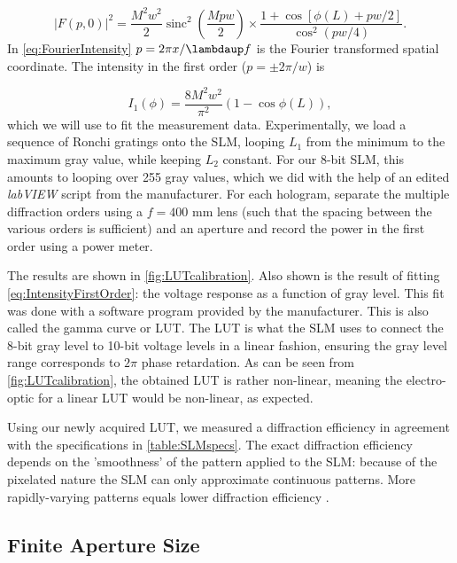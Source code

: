 \begin{equation}\label{eq:FourierIntensity}
    |F(p,0)|^2=
    \frac{M^2 w^2}{2}\operatorname{sinc}^2\left(\frac{M p w}{2}\right) \times
    \frac{1 + \cos{\left[\phi(L)+p w/2\right]}}{\cos^2(p w/4)}.
\end{equation}
In \cref{eq:FourierIntensity} $p=2\pi x/\lambdaup f$ is the Fourier transformed spatial coordinate. The intensity in the first order ($p=\pm 2\pi/w$) is

\begin{equation}\label{eq:IntensityFirstOrder}
    I_1(\phi) =
    \frac{8M^2w^2}{\pi^2} \left( 
    1-\cos{\phi(L)}
    \right),
\end{equation}
which we will use to fit the measurement data. Experimentally, we load a sequence of Ronchi gratings onto the SLM, looping $L_1$ from the minimum to the maximum gray value, while keeping $L_2$ constant. 
For our 8-bit SLM, this amounts to looping over 255 gray values, which we did with the help of an edited \textit{labVIEW} script from the manufacturer.
For each hologram, separate the multiple diffraction orders using a $f=400$ mm lens (such that the spacing between the various orders is sufficient) and an aperture and record the power in the first order using a power meter.

The results are shown in \cref{fig:LUTcalibration}. 
Also shown is the result of fitting \cref{eq:IntensityFirstOrder}: the voltage response as a function of gray level. 
This fit was done with a software program provided by the manufacturer.
This is also called the gamma curve or \ac{LUT}.
The LUT is what the SLM uses to connect the 8-bit gray level to 10-bit voltage levels in a linear fashion, ensuring the gray level range corresponds to $2\pi$ phase retardation.
As can be seen from \cref{fig:LUTcalibration}, the obtained LUT is rather non-linear, meaning the electro-optic for a linear LUT would be non-linear, as expected. 

Using our newly acquired LUT, we measured a diffraction efficiency in agreement with the specifications in \cref{table:SLMspecs}. 
The exact diffraction efficiency depends on the 'smoothness' of the pattern applied to the SLM: because of the pixelated nature the SLM can only approximate continuous patterns. 
More rapidly-varying patterns equals lower diffraction efficiency \cite{Labuhn2016}.

\subsection{Finite Aperture Size}\label{subsec:ApertureSize}


